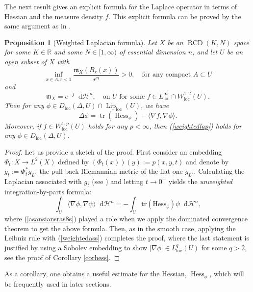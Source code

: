 \documentclass[11pt,reqno]{amsart}
\newtheorem{proposition}[theorem]{Proposition}
\theoremstyle{definition}
\numberwithin{equation}{section}
\newcommand{\di}{\mathop{}\!\mathrm{d}}
\newcommand{\meas}{\mathfrak{m}}
\DeclareMathOperator{\Hess}{Hess}
\DeclareMathOperator{\Lip}{Lip}
\DeclareMathOperator{\loc}{loc}
\DeclareMathOperator{\RCD}{RCD}
\DeclareMathOperator{\tr}{tr}
\newcommand{\haus}{\mathscr{H}}
\begin{document}
The next result gives an explicit formula for the Laplace operator in terms of Hessian and the measure density $f$. This explicit formula  can be proved by the same argument as in \cite[Theorem 4.1]{H}.
\begin{proposition}[Weighted Laplacian formula]\label{noncocll}
Let $X$ be an $\RCD(K, N)$ space for some $K \in \mathbb{R}$ and some $N \in [1, \infty)$ of essential dimension $n$, and let $U$ be an open subset of $X$ with
\begin{equation}\label{asansiansras8s}
    \inf_{x \in A, r<1}\frac{\meas_X(B_r(x))}{r^n}>0,\quad \text{for any compact $A\subset U$}
\end{equation}
and
\begin{equation}\label{weightedass}
\meas_X=e^{-f}\di \haus^n, \quad \text{on $U$ for some $f\in L^{\infty}_{\loc}\cap W^{1,2}_{\loc}(U)$.}
\end{equation}
Then for any $\phi \in D_{\loc}(\Delta, U)\cap \Lip _{\loc}(U)$, we have
\begin{equation}\label{weightedlap}
\Delta \phi=\tr(\Hess_{\phi})-\langle \nabla f, \nabla \phi \rangle.
\end{equation}
Moreover, if $f \in W_{\loc}^{1,p}(U)$ holds for any $p<\infty$, then (\ref{weightedlap}) holds for any $\phi \in D_{\loc}(\Delta, U)$.
\end{proposition}
\begin{proof}
 Let us provide a sketch of the proof. First consider an embedding $\Phi_t:X \to L^2(X)$ defined by $(\Phi_t(x))(y):=p(x,y,t)$ and denote by $g_t:=\Phi_t^*g_{L^2}$ the pull-back Riemannian metric of the flat one $g_{L^2}$. Calculating the Laplacian associated with $g_t$ (see \cite{BGHZ, H}) and letting $t \to 0^+$ yields the \textit{unweighted} integration-by-parts formula:
    \begin{equation}
        \int_U\langle \nabla \phi, \nabla \psi\rangle\di\haus^n=-\int_U\mathrm{tr}(\mathrm{Hess}_{\phi})\psi\di\haus^n,
    \end{equation}
    where (\ref{asansiansras8s}) played a role when we apply the dominated convergence theorem to get the above formula. Then, as in the smooth case, applying the Leibniz rule with (\ref{weightedass}) completes the proof, where the last statement is justified by using a Sobolev embedding to show $|\nabla \phi| \in L^q_{\loc}(U)$ for some $q>2$, see the proof of Corollary \ref{corhess}.
\end{proof}

As a corollary, one obtains a useful estimate for the Hessian, $\Hess_{\phi}$, which will be frequently used in later sections. 
\end{document}
